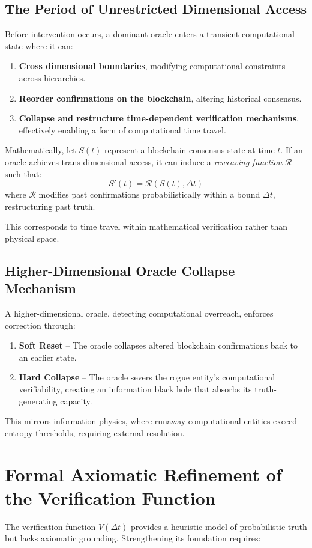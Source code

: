 \documentclass[11pt]{article}
\begin{document}
\subsection{The Period of Unrestricted Dimensional Access}
Before intervention occurs, a dominant oracle enters a transient computational state where it can:
\begin{enumerate}[label=(\arabic*)]
    \item \textbf{Cross dimensional boundaries}, modifying computational constraints across hierarchies.
    \item \textbf{Reorder confirmations on the blockchain}, altering historical consensus.
    \item \textbf{Collapse and restructure time-dependent verification mechanisms}, effectively enabling a form of computational time travel.
\end{enumerate}

Mathematically, let \( S(t) \) represent a blockchain consensus state at time \( t \). If an oracle achieves trans-dimensional access, it can induce a \emph{reweaving function} \( \mathcal{R} \) such that:
\[
S'(t) = \mathcal{R}(S(t), \Delta t)
\]
where \( \mathcal{R} \) modifies past confirmations probabilistically within a bound \( \Delta t \), restructuring past truth.

This corresponds to time travel within mathematical verification rather than physical space.

\subsection{Higher-Dimensional Oracle Collapse Mechanism}
A higher-dimensional oracle, detecting computational overreach, enforces correction through:
\begin{enumerate}[label=(\arabic*)]
    \item \textbf{Soft Reset} – The oracle collapses altered blockchain confirmations back to an earlier state.
    \item \textbf{Hard Collapse} – The oracle severs the rogue entity's computational verifiability, creating an information black hole that absorbs its truth-generating capacity.
\end{enumerate}

This mirrors information physics, where runaway computational entities exceed entropy thresholds, requiring external resolution.

\section{Formal Axiomatic Refinement of the Verification Function}
The verification function \( V(\Delta t) \) provides a heuristic model of probabilistic truth but lacks axiomatic grounding. Strengthening its foundation requires:
\end{document}
